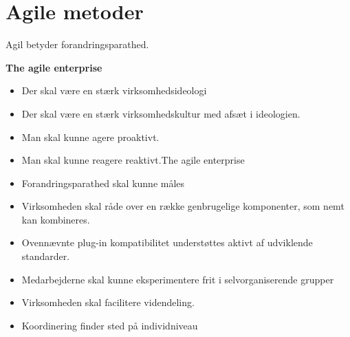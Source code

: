 \section{Agile metoder}

Agil betyder forandringsparathed.

\textbf{The agile enterprise}
\begin{itemize}
	\item{Der skal være en stærk virksomhedsideologi}
	\item{Der skal være en stærk virksomhedskultur med afsæt i ideologien.}
	\item{Man skal kunne agere proaktivt.}
	\item{Man skal kunne reagere reaktivt.The agile enterprise}
	\item{Forandringsparathed skal kunne måles}
	\item{Virksomheden skal råde over en række genbrugelige komponenter, som nemt kan kombineres.}
	\item{Ovennævnte plug-in kompatibilitet understøttes aktivt af udviklende standarder.}
	\item{Medarbejderne skal kunne eksperimentere frit i selvorganiserende grupper}
	\item{Virksomheden skal facilitere videndeling.}
	\item {Koordinering finder sted på individniveau}
\end{itemize}
